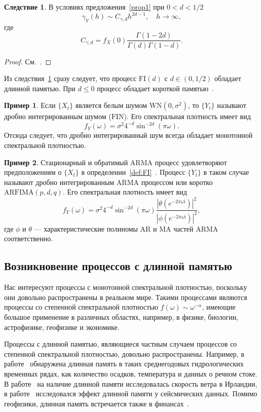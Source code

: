 \documentclass[specialist,
substylefile = spbu_report.rtx,
subf,href,colorlinks=true, 12pt]{disser}
\theoremstyle{definition}
\newtheorem{example}{Пример}[section]
\newtheorem{corollary}{Следствие}[section]
\newcommand{\im}{\mathrm{i}}
\begin{document}
\begin{corollary}\label{corollary1}
	В условиях предложения~\ref{prop1} при $0<d<1/2$
	\[
		\gamma_Y(h)\sim C_{\gamma,d}h^{2d-1},\quad h\to\infty,
	\]
	где
	\[
		C_{\gamma,d}=f_X(0)\frac{\Gamma(1-2d)}{\Gamma(d)\Gamma(1-d)}.
	\]
\end{corollary}
\begin{proof}
	См.~\cite[Corollary 6.1]{Hassler2018}.
\end{proof}
Из следствия~\ref{corollary1} сразу следует, что процесс $\mathrm{FI}(d)$ с $d\in(0, 1/2)$ обладает длинной памятью. При $d\leqslant 0$ процесс обладает короткой памятью~\cite[Section 6.2]{Hassler2018}.
\begin{example}
	Если $\{X_t\}$ является белым шумом $\mathrm{WN}(0, \sigma^2)$, то $\{Y_t\}$ называют дробно интегрированным шумом ($\mathrm{FIN}$). Его спектральная плотность имеет вид
	\[
		f_Y(\omega)=\sigma^2 4^{-d}\sin^{-2d}\left(\pi\omega\right).
	\]
	Отсюда следует, что дробно интегрированный шум всегда обладает монотонной спектральной плотностью.
\end{example}
\begin{example}
	Стационарный и обратимый $\mathrm{ARMA}$ процесс удовлетворяют предположениям о $\{X_t\}$ в определении~\ref{def:FI}~\cite[Proposition 3.5]{Hassler2018}. Процесс $\{Y_t\}$ в таком случае называют дробно интегрированным $\mathrm{ARMA}$ процессом или коротко $\mathrm{ARFIMA}(p, d, q)$. Его спектральная плотность имеет вид
	\[
		f_Y(\omega)=\sigma^2 4^{-d}\sin^{-2d}\left(\pi\omega\right)\frac{\left|\theta(e^{-2\pi \omega\im})\right|^2}{\left|\phi(e^{-2\pi\omega\im})\right|^2},
	\]
	где $\phi$ и $\theta$ --- характеристические полиномы $\mathrm{AR}$ и $\mathrm{MA}$ частей $\mathrm{ARMA}$ соответственно.
\end{example}

\subsection{Возникновение процессов с длинной памятью}
Нас интересуют процессы с монотонной спектральной плотностью, поскольку они довольно распространены в реальном мире. Такими процессами являются процессы со степенной спектральной плотностью $f(\omega)\sim \omega^{-\alpha}$, имеющие большое применение в различных областях, например, в физике, биологии, астрофизике, геофизике и экономике.

Процессы с длинной памятью, являющиеся частным случаем процессов со степенной спектральной плотностью, довольно распространены. Например, в работе~\cite{Hipel1994} обнаружена длинная память в таких среднегодовых гидрологических временных рядах, как количество осадков, температура и данных о речном стоке. В работе~\cite{Haslett1989} на наличие длинной памяти исследовалась скорость ветра в Ирландии, в работе~\cite{Mariani2020} исследовался эффект длинной памяти у сейсмических данных. Помимо геофизики, длинная память встречается также в финансах~\cite{Barkoulas1997,Guglielmo2019}.
\end{document}
